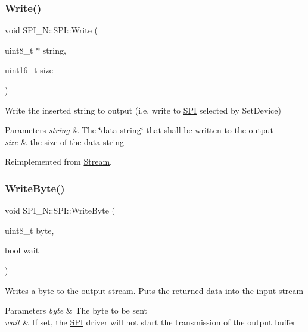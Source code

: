 \subsubsection{\texorpdfstring{Write()}{Write()}}
{\footnotesize\ttfamily void S\+P\+I\+\_\+\+N\+::\+S\+P\+I\+::\+Write (\begin{DoxyParamCaption}\item[{uint8\+\_\+t $\ast$}]{string,  }\item[{uint16\+\_\+t}]{size }\end{DoxyParamCaption})\hspace{0.3cm}{\ttfamily [virtual]}}

Write the inserted string to output (i.\+e. write to \hyperlink{class_s_p_i___n_1_1_s_p_i}{S\+PI} selected by Set\+Device) 
\begin{DoxyParams}{Parameters}
{\em string} & The \char`\"{}data string\char`\"{} that shall be written to the output \\
\hline
{\em size} & the size of the data string \\
\hline
\end{DoxyParams}


Reimplemented from \hyperlink{class_stream_a508be3423e4d99ab2757275fb723002a}{Stream}.

\hypertarget{class_s_p_i___n_1_1_s_p_i_a542dc8e88203de7040ce9926d06b9463}{}\label{class_s_p_i___n_1_1_s_p_i_a542dc8e88203de7040ce9926d06b9463} 
\subsubsection{\texorpdfstring{Write\+Byte()}{WriteByte()}}
{\footnotesize\ttfamily void S\+P\+I\+\_\+\+N\+::\+S\+P\+I\+::\+Write\+Byte (\begin{DoxyParamCaption}\item[{uint8\+\_\+t}]{byte,  }\item[{bool}]{wait }\end{DoxyParamCaption})}

Writes a byte to the output stream. Puts the returned data into the input stream 
\begin{DoxyParams}{Parameters}
{\em byte} & The byte to be sent \\
\hline
{\em wait} & If set, the \hyperlink{class_s_p_i___n_1_1_s_p_i}{S\+PI} driver will not start the transmission of the output buffer \\
\hline
\end{DoxyParams}
\hypertarget{class_s_p_i___n_1_1_s_p_i_a05bcca2e033422b2e6ad570320d03fcb}{}\label{class_s_p_i___n_1_1_s_p_i_a05bcca2e033422b2e6ad570320d03fcb} 

